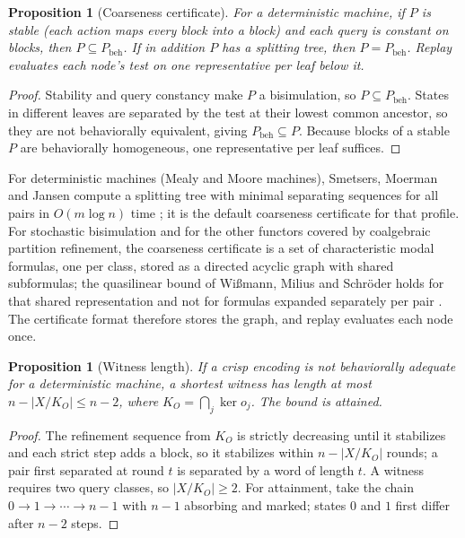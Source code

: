 \documentclass[11pt]{article}
\newcommand{\Pbeh}{P_{\mathrm{beh}}}
\theoremstyle{definition}
\theoremstyle{plain}
\newtheorem{proposition}[definition]{Proposition}
\begin{document}
\begin{proposition}[Coarseness certificate]\label{prop:splitting}
For a deterministic machine, if $P$ is stable (each action maps every block into a block) and each
query is constant on blocks, then $P\subseteq\Pbeh$. If in addition $P$ has a splitting tree, then
$P=\Pbeh$. Replay evaluates each node's test on one representative per leaf below it.
\end{proposition}

\begin{proof}
Stability and query constancy make $P$ a bisimulation, so $P\subseteq\Pbeh$. States in different
leaves are separated by the test at their lowest common ancestor, so they are not behaviorally
equivalent, giving $\Pbeh\subseteq P$. Because blocks of a stable $P$ are behaviorally homogeneous,
one representative per leaf suffices.
\end{proof}

For deterministic machines (Mealy and Moore machines), Smetsers, Moerman and Jansen compute a
splitting tree with minimal separating sequences for all pairs in $O(m\log n)$ time
\cite{smetsers}; it is the default coarseness certificate for that profile. For stochastic
bisimulation and for the other functors covered by coalgebraic partition refinement, the
coarseness certificate is a set of characteristic modal formulas, one per class, stored as a
directed acyclic graph with shared subformulas; the quasilinear bound of Wi\ss{}mann, Milius and
Schr\"oder holds for that shared representation and not for formulas expanded separately per pair
\cite{explaining}. The certificate format therefore stores the graph, and replay evaluates each node
once.

\begin{proposition}[Witness length]\label{prop:witnesslength}
If a crisp encoding is not behaviorally adequate for a deterministic machine, a shortest witness
has length at most $n-|X/K_O|\le n-2$, where $K_O=\bigcap_j\ker o_j$. The bound is attained.
\end{proposition}

\begin{proof}
The refinement sequence from $K_O$ is strictly decreasing until it stabilizes and each strict
step adds a block, so it stabilizes within $n-|X/K_O|$ rounds; a pair first separated at round
$t$ is separated by a word of length $t$. A witness requires two query classes, so
$|X/K_O|\ge2$. For attainment, take the chain $0\to1\to\cdots\to n-1$ with $n-1$ absorbing and
marked; states $0$ and $1$ first differ after $n-2$ steps.
\end{proof}
\end{document}
